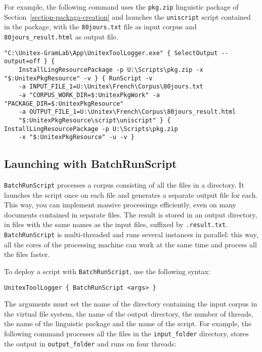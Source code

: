 \noindent For example, the following command uses the \verb$pkg.zip$ linguistic package of
Section~\ref{section-packaga-creation} and launches the 
 \verb$uniscript$ script contained in the package, with the \verb$80jours.txt$ file as input corpus
and \verb$80jours_result.html$ as output file.

\begin{Verbatim}[fontsize=\small,fontfamily=helvetica]
"C:\Unitex-GramLab\App\UnitexToolLogger.exe" { SelectOutput --output=off } {
    InstallLingResourcePackage -p U:\Scripts\pkg.zip -x "$:UnitexPkgResource" -v } { RunScript -v
    -a INPUT_FILE_1=U:\Unitex\French\Corpus\80jours.txt 
    -a "CORPUS_WORK_DIR=$:UnitexPkgWork" -a "PACKAGE_DIR=$:UnitexPkgResource"
    -a OUTPUT_FILE_1=U:\Unitex\French\Corpus\80jours_result.html 
    "$:UnitexPkgResource\script\uniscript" } { InstallLingResourcePackage -p U:\Scripts\pkg.zip 
    -x "$:UnitexPkgResource" -u -v }
\end{Verbatim}



\subsection{Launching with BatchRunScript}
\label{launch-script}

\verb$BatchRunScript$ processes a corpus consisting of all the files in a directory.
It launches the script once on each file and generates a separate output file for each.
This way, you can implement massive processings efficiently, even on many documents
contained in separate files. The result is stored in an output directory, in files
with the same names as the input files, suffixed by \verb$.result.txt$.
\verb$BatchRunScript$ is multi-threaded and runs several instances in parallel: this way,
all the cores of the processing machine can work at the same time and process all the files faster.

\bigskip
\noindent To deploy a script with \verb$BatchRunScript$, use the following syntax:

\begin{verbatim}
UnitexToolLogger { BatchRunScript <args> }
\end{verbatim}

\noindent The arguments must set the name of the directory containing the input corpus
in the virtual file system, the name of the output directory, the number of threads, the name
of the linguistic package and the name of the script. For example, the following command processes
all the files in the \verb$input_folder$ directory, stores the output in \verb$output_folder$ and runs
on four threads:

